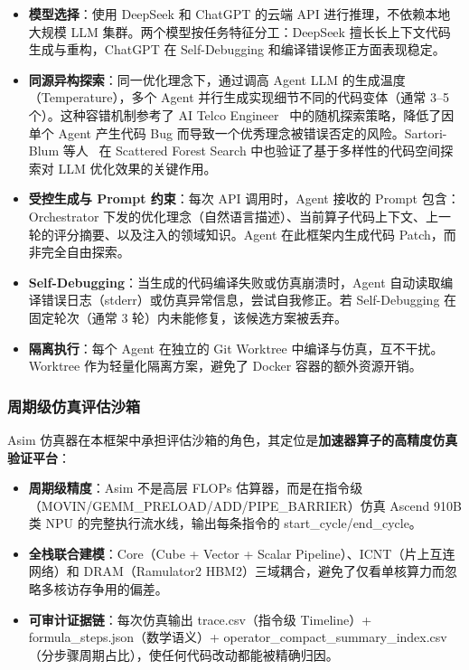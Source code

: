 \documentclass{CjC}
\begin{document}
    \begin{itemize}
        \item \textbf{模型选择}：使用 DeepSeek 和 ChatGPT 的云端 API 进行推理，不依赖本地大规模
            LLM 集群。两个模型按任务特征分工：DeepSeek 擅长长上下文代码生成与重构，ChatGPT
            在 Self-Debugging 和编译错误修正方面表现稳定。

        \item \textbf{同源异构探索}：同一优化理念下，通过调高 Agent LLM 的生成温度（Temperature），多个
            Agent 并行生成实现细节不同的代码变体（通常 3--5
            个）。这种容错机制参考了 AI Telco Engineer~\cite{aitaoudia2026aitelcoengineer}
            中的随机探索策略，降低了因单个 Agent 产生代码 Bug
            而导致一个优秀理念被错误否定的风险。Sartori-Blum 等人~\cite{sartori2024scatteredforest}
            在 Scattered Forest Search 中也验证了基于多样性的代码空间探索对 LLM
            优化效果的关键作用。

        \item \textbf{受控生成与 Prompt 约束}：每次 API 调用时，Agent 接收的 Prompt
            包含：Orchestrator 下发的优化理念（自然语言描述）、当前算子代码上下文、上一轮的评分摘要、以及注入的领域知识。Agent
            在此框架内生成代码 Patch，而非完全自由探索。

        \item \textbf{Self-Debugging}：当生成的代码编译失败或仿真崩溃时，Agent 自动读取编译错误日志（stderr）或仿真异常信息，尝试自我修正。若
            Self-Debugging 在固定轮次（通常 3 轮）内未能修复，该候选方案被丢弃。

        \item \textbf{隔离执行}：每个 Agent 在独立的 Git Worktree 中编译与仿真，互不干扰。Worktree
            作为轻量化隔离方案，避免了 Docker 容器的额外资源开销。
    \end{itemize}

    \subsubsection{周期级仿真评估沙箱}

    Asim 仿真器在本框架中承担评估沙箱的角色，其定位是\textbf{加速器算子的高精度仿真验证平台}：

    \begin{itemize}
        \item \textbf{周期级精度}：Asim 不是高层 FLOPs 估算器，而是在指令级（MOVIN/GEMM\_PRELOAD/ADD/PIPE\_BARRIER）仿真
            Ascend 910B 类 NPU 的完整执行流水线，输出每条指令的 start\_cycle/end\_cycle。

        \item \textbf{全栈联合建模}：Core（Cube + Vector + Scalar Pipeline）、ICNT（片上互连网络）和
            DRAM（Ramulator2 HBM2）三域耦合，避免了仅看单核算力而忽略多核访存争用的偏差。

        \item \textbf{可审计证据链}：每次仿真输出 trace.csv（指令级 Timeline）+
            formula\_steps.json（数学语义）+ operator\_compact\_summary\_index.csv（分步骤周期占比），使任何代码改动都能被精确归因。
    \end{itemize}
\end{document}
